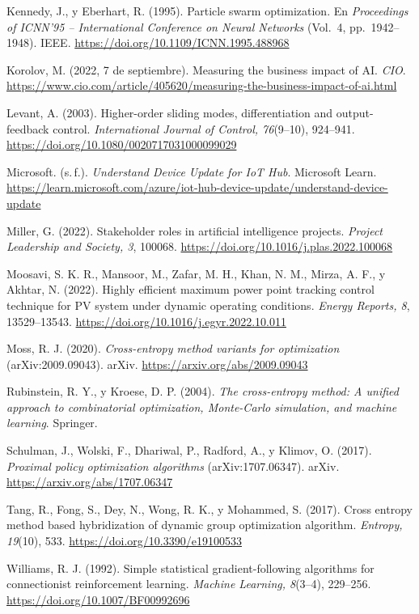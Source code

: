 \documentclass[letterpaper,11pt]{article}
\begin{document}
Kennedy, J., y Eberhart, R. (1995). Particle swarm optimization. En \textit{Proceedings of ICNN'95 -- International Conference on Neural Networks} (Vol.~4, pp.~1942--1948). IEEE. \url{https://doi.org/10.1109/ICNN.1995.488968}

Korolov, M. (2022, 7 de septiembre). Measuring the business impact of AI. \textit{CIO}. \url{https://www.cio.com/article/405620/measuring-the-business-impact-of-ai.html}

Levant, A. (2003). Higher-order sliding modes, differentiation and output-feedback control. \textit{International Journal of Control, 76}(9--10), 924--941. \url{https://doi.org/10.1080/0020717031000099029}

Microsoft. (s.\,f.). \textit{Understand Device Update for IoT Hub}. Microsoft Learn. \url{https://learn.microsoft.com/azure/iot-hub-device-update/understand-device-update}

Miller, G. (2022). Stakeholder roles in artificial intelligence projects. \textit{Project Leadership and Society, 3}, 100068. \url{https://doi.org/10.1016/j.plas.2022.100068}

Moosavi, S. K. R., Mansoor, M., Zafar, M. H., Khan, N. M., Mirza, A. F., y Akhtar, N. (2022). Highly efficient maximum power point tracking control technique for PV system under dynamic operating conditions. \textit{Energy Reports, 8}, 13529--13543. \url{https://doi.org/10.1016/j.egyr.2022.10.011}

Moss, R. J. (2020). \textit{Cross-entropy method variants for optimization} (arXiv:2009.09043). arXiv. \url{https://arxiv.org/abs/2009.09043}

Rubinstein, R. Y., y Kroese, D. P. (2004). \textit{The cross-entropy method: A unified approach to combinatorial optimization, Monte-Carlo simulation, and machine learning}. Springer.

Schulman, J., Wolski, F., Dhariwal, P., Radford, A., y Klimov, O. (2017). \textit{Proximal policy optimization algorithms} (arXiv:1707.06347). arXiv. \url{https://arxiv.org/abs/1707.06347}

Tang, R., Fong, S., Dey, N., Wong, R. K., y Mohammed, S. (2017). Cross entropy method based hybridization of dynamic group optimization algorithm. \textit{Entropy, 19}(10), 533. \url{https://doi.org/10.3390/e19100533}

Williams, R. J. (1992). Simple statistical gradient-following algorithms for connectionist reinforcement learning. \textit{Machine Learning, 8}(3--4), 229--256. \url{https://doi.org/10.1007/BF00992696}
\end{document}
